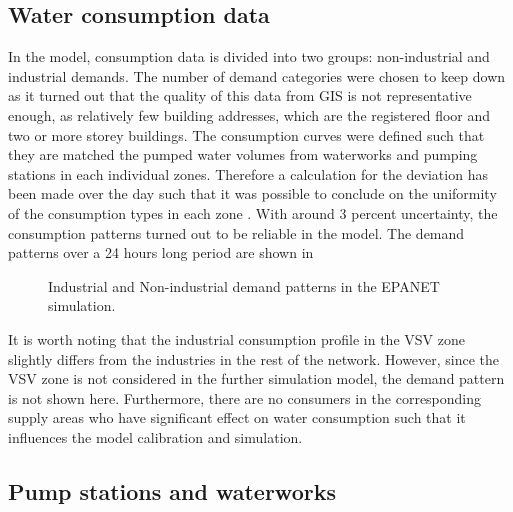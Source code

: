 \subsection{Water consumption data}
\label{water_consumption_data}

In the model, consumption data is divided into two groups: non-industrial and industrial demands. The number of demand categories were chosen to keep down as it turned out that the quality of this data from GIS is not representative enough, as relatively few building addresses, which are the registered floor and  two or more storey buildings. The consumption curves were defined such that they are matched the pumped water volumes from waterworks and pumping stations in each individual zones. Therefore a calculation for the deviation has been made over the day such that it was possible to conclude on the uniformity of the consumption types in each zone \cite{verdo_doc}. With around 3 percent uncertainty, the consumption patterns turned out to be reliable in the model. The demand patterns over a 24 hours long period are shown in  

\begin{figure}[H]
\centering

\caption{Industrial and Non-industrial demand patterns in the EPANET simulation.}
\label{fig:demandpatterns_EPANET}
\end{figure}

It is worth noting that the industrial consumption profile in the VSV zone slightly differs from the industries in the rest of the network. However, since the VSV zone is not considered in the further simulation model, the demand pattern is not shown here. Furthermore, there are no consumers in the corresponding supply areas who have  significant effect on water consumption such that it influences the model calibration and simulation. 

\subsection{Pump stations and waterworks}
\label{pump_stations_andwaterworks}

